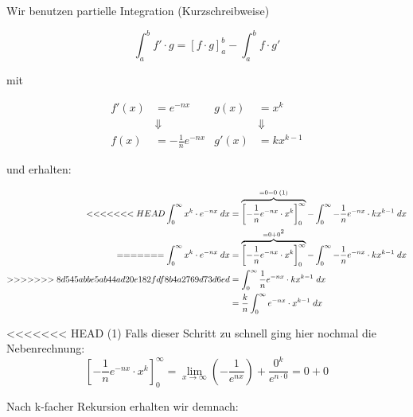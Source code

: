 \documentclass[a4paper,german,12pt]{scrartcl}
\begin{document}
Wir benutzen partielle Integration (Kurzschreibweise)

\begin{equation*}
  \int_a^b f' \cdot g = \left[f \cdot g\right]_a^b - \int_a^b f \cdot g'
\end{equation*}

mit

\begin{align*}
  f'(x) &= e^{-nx} & g(x) &= x^k \\
        &\Downarrow & &\Downarrow\\
  f(x) &= -\frac{1}{n} e^{-nx} & g'(x) &= kx^{k-1}
\end{align*}

und erhalten:

\begin{align*}
<<<<<<< HEAD
  \int_0^\infty x^k \cdot e^{-nx} \; dx &= \overbrace{\left[-\frac{1}{n} e^{-nx} \cdot x^k\right]_0^\infty}^{=0-0\; (1)} - \int_0^\infty -\frac{1}{n}e^{-nx} \cdot kx^{k-1} \; dx \\
=======
  \int_0^\infty x^k \cdot e^{-nx} \; dx  &= \overbrace{\left[-\frac{1}{n} e^{-nx} \cdot x^k\right]_0^\infty}^{=0+0\footnotemark[2]} - \int_0^\infty -\frac{1}{n}e^{-nx} \cdot kx^{k-1} \; dx \\
>>>>>>> 8d545abbe5ab44ad20e182fdf8b4a2769d73d6ed
                                         &= \int_0^\infty \frac{1}{n}e^{-nx} \cdot kx^{k-1} \; dx \\
                                         &= \frac{k}{n} \int_0^\infty e^{-nx} \cdot x^{k-1} \; dx
\end{align*}

<<<<<<< HEAD
(1) Falls dieser Schritt zu schnell ging hier nochmal die Nebenrechnung:
\begin{equation*}
\left[-\frac{1}{n} e^{-nx} \cdot x^k\right]_0^\infty = \lim\limits_{x \to \infty}\left(-\frac{1}{e^{nx}}\right) + \frac{0^k}{e^{n\cdot 0}}=0 + 0
\end{equation*}

Nach k-facher Rekursion erhalten wir demnach:
\end{document}
